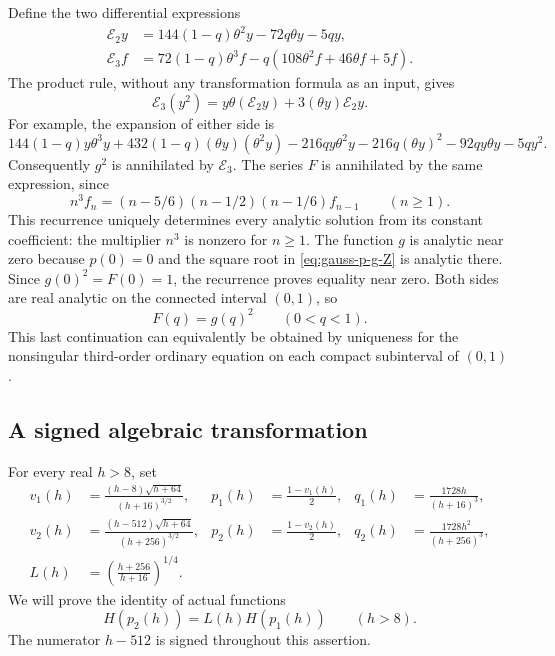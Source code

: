 \documentclass[11pt,a4paper]{article}
\begin{document}
Define the two differential expressions
\[
\begin{aligned}
 \mathcal E_2y&=144(1-q)\theta^2y-72q\theta y-5qy,\\
 \mathcal E_3f&=72(1-q)\theta^3f
                      -q(108\theta^2f+46\theta f+5f).
\end{aligned}
\]
The product rule, without any transformation formula as an input, gives
\begin{equation}\label{eq:gauss-symmetric-square-identity}
 \mathcal E_3(y^2)
       =y\theta(\mathcal E_2y)+3(\theta y)\mathcal E_2y.
\end{equation}
For example, the expansion of either side is
\[
144(1-q)y\theta^3y+432(1-q)(\theta y)(\theta^2y)
-216qy\theta^2y-216q(\theta y)^2-92qy\theta y-5qy^2.
\]
Consequently $g^2$ is annihilated by $\mathcal E_3$.
The series $F$ is annihilated by the same expression, since
\begin{equation}\label{eq:gauss-native-recurrence}
 n^3 f_n=(n-5/6)(n-1/2)(n-1/6)f_{n-1}
 \qquad(n\geq1).
\end{equation}
This recurrence uniquely determines every analytic solution from its
constant coefficient: the multiplier $n^3$ is nonzero for $n\geq1$.
The function $g$ is analytic near zero because $p(0)=0$ and the square
root in \eqref{eq:gauss-p-g-Z} is analytic there.  Since $g(0)^2=F(0)=1$,
the recurrence proves equality near zero.  Both sides are real analytic
on the connected interval $(0,1)$, so
\begin{equation}\label{eq:symmetric-square}
                         F(q)=g(q)^2\qquad(0<q<1).
\end{equation}
This last continuation can equivalently be obtained by uniqueness for
the nonsingular third-order ordinary equation on each compact
subinterval of $(0,1)$.

\subsection{A signed algebraic transformation}

For every real $h>8$, set
\begin{equation}\label{eq:gauss-h-parameters}
\begin{aligned}
 v_1(h)&=\frac{(h-8)\sqrt{h+64}}{(h+16)^{3/2}},&
 p_1(h)&=\frac{1-v_1(h)}2,&
 q_1(h)&=\frac{1728h}{(h+16)^3},\\
 v_2(h)&=\frac{(h-512)\sqrt{h+64}}{(h+256)^{3/2}},&
 p_2(h)&=\frac{1-v_2(h)}2,&
 q_2(h)&=\frac{1728h^2}{(h+256)^3},\\
 L(h)&=\left(\frac{h+256}{h+16}\right)^{1/4}.&&&
\end{aligned}
\end{equation}
We will prove the identity of actual functions
\begin{equation}\label{eq:gauss-signed-transformation}
                         H(p_2(h))=L(h)H(p_1(h))
                         \qquad(h>8).
\end{equation}
The numerator $h-512$ is signed throughout this assertion.
\end{document}
